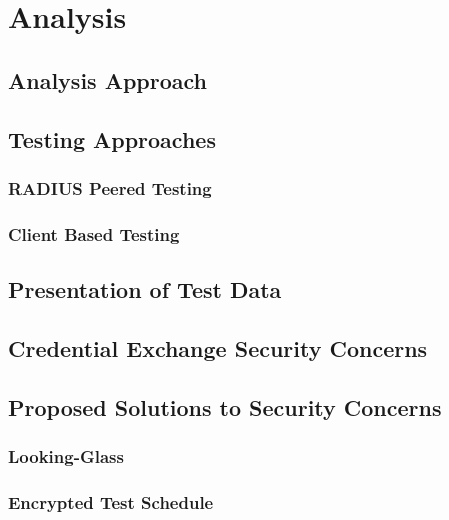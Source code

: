 
\section{Analysis}
\subsection{Analysis Approach}

\subsection{Testing Approaches}

\subsubsection{RADIUS Peered Testing}

\subsubsection{Client Based Testing}

\subsection{Presentation of Test Data}


\subsection{Credential Exchange Security Concerns}

\subsection{Proposed Solutions to Security Concerns}
\subsubsection{Looking-Glass}

\subsubsection{Encrypted Test Schedule}


